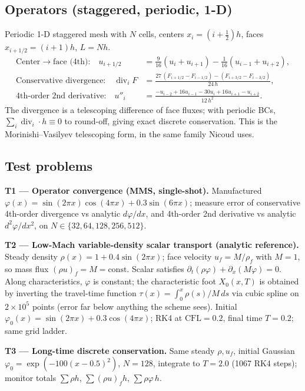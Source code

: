 \documentclass[11pt]{article}
\begin{document}
\subsection{Operators (staggered, periodic, 1-D)}
Periodic 1-D staggered mesh with \(N\) cells, centers \(x_i=(i+\tfrac12)h\),
faces \(x_{i+1/2}=(i+1)h\), \(L=Nh\).
\begin{align}
\text{Center}\to\text{face (4th):}\quad
u_{i+1/2} &= \tfrac{9}{16}(u_i+u_{i+1}) - \tfrac{1}{16}(u_{i-1}+u_{i+2}),\\
\text{Conservative divergence:}\quad
\operatorname{div}_i F &= \frac{27\,(F_{i+1/2}-F_{i-1/2}) - (F_{i+3/2}-F_{i-3/2})}{24\,h},\\
\text{4th-order 2nd derivative:}\quad
u''_i &= \frac{-u_{i-2}+16u_{i-1}-30u_i+16u_{i+1}-u_{i+2}}{12\,h^2}.
\end{align}
The divergence is a telescoping difference of face fluxes; with periodic BCs,
\(\sum_i \operatorname{div}_i\cdot h \equiv 0\) to round-off, giving exact
discrete conservation. This is the Morinishi--Vasilyev telescoping form, in
the same family Nicoud uses.

\subsection{Test problems}
\textbf{T1 --- Operator convergence (MMS, single-shot).} Manufactured
\(\varphi(x)=\sin(2\pi x)\cos(4\pi x)+0.3\sin(6\pi x)\); measure error of
conservative 4th-order divergence vs analytic \(d\varphi/dx\), and
4th-order 2nd derivative vs analytic \(d^2\varphi/dx^2\), on
\(N\in\{32,64,128,256,512\}\).

\textbf{T2 --- Low-Mach variable-density scalar transport (analytic reference).}
Steady density \(\rho(x)=1+0.4\sin(2\pi x)\); face velocity \(u_f=M/\rho_f\)
with \(M=1\), so mass flux \((\rho u)_f=M=\text{const}\). Scalar satisfies
\(\partial_t(\rho\varphi)+\partial_x(M\varphi)=0\). Along characteristics,
\(\varphi\) is constant; the characteristic foot \(X_0(x,T)\) is obtained by
inverting the travel-time function \(\tau(x)=\int_0^x \rho(s)/M\,ds\) via
cubic spline on \(2\times10^5\) points (error far below anything the scheme
sees). Initial \(\varphi_0(x)=\sin(2\pi x)+0.3\cos(4\pi x)\); RK4 at
\(\text{CFL}=0.2\), final time \(T=0.2\); same grid ladder.

\textbf{T3 --- Long-time discrete conservation.} Same steady \(\rho,u_f\),
initial Gaussian \(\varphi_0=\exp(-100(x-0.5)^2)\), \(N=128\), integrate to
\(T=2.0\) (1067 RK4 steps); monitor totals \(\sum\rho h\), \(\sum(\rho u)_f h\),
\(\sum\rho\varphi\,h\).
\end{document}
